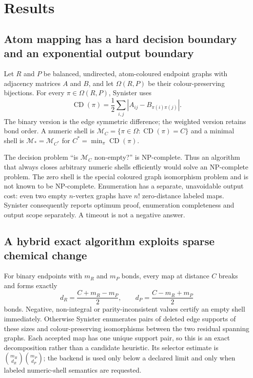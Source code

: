 \documentclass[11pt]{article}
\newcommand{\CD}{\operatorname{CD}}
\begin{document}
\section*{Results}

\subsection*{Atom mapping has a hard decision boundary and an exponential
output boundary}

Let $R$ and $P$ be balanced, undirected, atom-coloured endpoint graphs with
adjacency matrices $A$ and $B$, and let $\Omega(R,P)$ be their
colour-preserving bijections.  For every $\pi\in\Omega(R,P)$, Synister uses
\begin{equation}
 \CD(\pi)=\frac12\sum_{i,j}
  \left|A_{ij}-B_{\pi(i)\pi(j)}\right| .
 \label{eq:cd}
\end{equation}
The binary version is the edge symmetric difference; the weighted version
retains bond order.  A numeric shell is
$\mathcal M_C=\{\pi\in\Omega:\CD(\pi)=C\}$ and a minimal shell is
$\mathcal M_*=\mathcal M_{C^*}$ for
$C^*=\min_\pi\CD(\pi)$.

The decision problem ``is $\mathcal M_C$ non-empty?'' is NP-complete.  Thus
an algorithm that always closes arbitrary numeric shells efficiently would
solve an NP-complete problem.  The zero shell is the special coloured graph
isomorphism problem and is not known to be NP-complete.  Enumeration has a
separate, unavoidable output cost: even two empty $n$-vertex graphs have
$n!$ zero-distance labeled maps.  Synister consequently reports optimum proof,
enumeration completeness and output scope separately.  A timeout is not a
negative answer.

\subsection*{A hybrid exact algorithm exploits sparse chemical change}

For binary endpoints with $m_R$ and $m_P$ bonds, every map at distance $C$
breaks and forms exactly
\begin{equation}
 d_R=\frac{C+m_R-m_P}{2},\qquad
 d_P=\frac{C-m_R+m_P}{2}
 \label{eq:edit-budget}
\end{equation}
bonds.  Negative, non-integral or parity-inconsistent values certify an empty
shell immediately.  Otherwise Synister enumerates pairs of deleted edge
supports of these sizes and colour-preserving isomorphisms between the two
residual spanning graphs.  Each accepted map has one unique support pair, so
this is an exact decomposition rather than a candidate heuristic.  Its
selector estimate is
$\binom{m_R}{d_R}\binom{m_P}{d_P}$; the backend is used only below a declared
limit and only when labeled numeric-shell semantics are requested.
\end{document}
